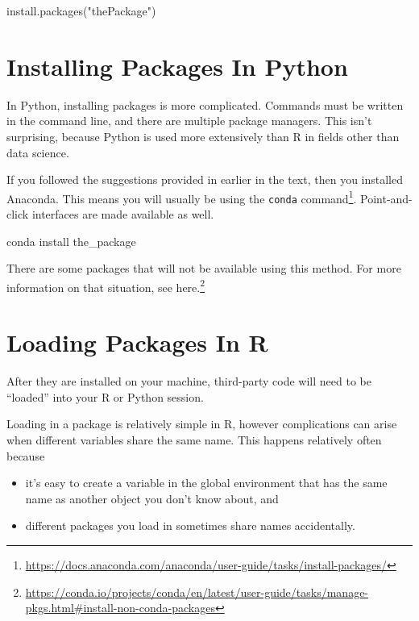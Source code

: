 \documentclass[
  12pt,
  krantz2]{krantz}
\makeatletter
\newenvironment{Shaded}{\begin{snugshade}}{\end{snugshade}}
\newcommand{\ExtensionTok}[1]{#1}
\newcommand{\FunctionTok}[1]{\textcolor[rgb]{0,0,0}{#1}}
\newcommand{\NormalTok}[1]{#1}
\newcommand{\StringTok}[1]{\textcolor[rgb]{0.5,0.5,0.5}{#1}}
\providecommand{\tightlist}{%
  \setlength{\itemsep}{0pt}\setlength{\parskip}{0pt}}
\renewcommand{\href}[2]{#2\footnote{\url{#1}}}
\newenvironment{kframe}{%
\medskip{}
\setlength{\fboxsep}{.8em}
 \def\at@end@of@kframe{}%
 \ifinner\ifhmode%
  \def\at@end@of@kframe{\end{minipage}}%
  \begin{minipage}{\columnwidth}%
 \fi\fi%
 \def\FrameCommand##1{\hskip\@totalleftmargin \hskip-\fboxsep
 \colorbox{shadecolor}{##1}\hskip-\fboxsep
     \hskip-\linewidth \hskip-\@totalleftmargin \hskip\columnwidth}%
 \MakeFramed {\advance\hsize-\width
   \@totalleftmargin\z@ \linewidth\hsize
   \@setminipage}}%
 {\par\unskip\endMakeFramed%
 \at@end@of@kframe}
\renewenvironment{Shaded}{\begin{kframe}}{\end{kframe}}
\makeatother
\begin{document}
\begin{Shaded}
\begin{Highlighting}[]
\FunctionTok{install.packages}\NormalTok{(}\StringTok{"thePackage"}\NormalTok{)}
\end{Highlighting}
\end{Shaded}

\hypertarget{installing-packages-in-python}{%
\section{Installing Packages In Python}\label{installing-packages-in-python}}

In Python, installing packages is more complicated. Commands must be written in the command line, and there are multiple package managers. This isn't surprising, because Python is used more extensively than R in fields other than data science.

If you followed the suggestions provided in earlier in the text, then you installed Anaconda. This means you will usually be using the \href{https://docs.anaconda.com/anaconda/user-guide/tasks/install-packages/}{\texttt{conda} command}. Point-and-click interfaces are made available as well.

\begin{Shaded}
\begin{Highlighting}[]
\ExtensionTok{conda}\NormalTok{ install the\_package}
\end{Highlighting}
\end{Shaded}

There are some packages that will not be available using this method. For more information on that situation, see \href{https://conda.io/projects/conda/en/latest/user-guide/tasks/manage-pkgs.html\#install-non-conda-packages}{here.}

\hypertarget{loading-packages-in-r}{%
\section{Loading Packages In R}\label{loading-packages-in-r}}

After they are installed on your machine, third-party code will need to be ``loaded'' into your R or Python session.

Loading in a package is relatively simple in R, however complications can arise when different variables share the same name. This happens relatively often because

\begin{itemize}
\tightlist
\item
  it's easy to create a variable in the global environment that has the same name as another object you don't know about, and
\item
  different packages you load in sometimes share names accidentally.
\end{itemize}
\end{document}
